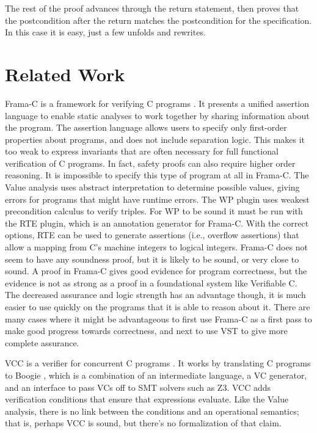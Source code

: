 \documentclass{puthesis}
\begin{document}
The rest of the proof advances through the return statement, then proves that
the postcondition after the return matches the postcondition for the 
specification. In this case it is easy, just a few unfolds and rewrites.


\section{Related Work}
Frama-C is a framework for verifying C programs
\cite{cuoq2012frama}. It presents a unified assertion language to
enable static analyses to work together by sharing information about
the program. The assertion language allows
users to specify only first-order properties about programs, and does
not include separation logic. This makes it too weak to express
invariants that are often necessary for full functional verification
of C programs. In fact, safety proofs can also require higher order
reasoning. It is impossible to specify this type of program at all in Frama-C.
The Value analysis \cite{canet2009value}
uses abstract interpretation to determine possible values, giving
errors for programs that might have runtime errors. The WP plugin uses
weakest precondition \cite{mull} calculus to verify triples.  For WP to be sound
it must be run with the RTE plugin\cite{RTEpluginmanual}, which is an annotation generator
for Frama-C. With the correct options, RTE can be used to generate
assertions (i.e., overflow assertions) that allow a mapping from C's
machine integers to logical integers. 
Frama-C does not seem to have any soundness proof, but it is likely to
be sound, or very close to sound. A proof in Frama-C gives good
evidence for program correctness, but the evidence is not as strong as
a proof in a foundational system like Verifiable C. The decreased
assurance and logic strength has an advantage though, it is much
easier to use quickly on the programs that it is able to reason about
it. There are many cases where it might be advantageous to first use
Frama-C as a first pass to make good progress towards correctness, and
next to use VST to give more complete assurance. 

VCC is a verifier for concurrent C programs \cite{VCCtphol}. It works
by translating C programs to Boogie \cite{Boogie}, which is a
combination of an intermediate language, a VC generator, and an
interface to pass VCs off to SMT solvers such as Z3\cite{z3:tacas}.
VCC adds verification conditions that ensure that expressions
evaluate. Like the Value analysis, there is no link between the
conditions and an operational semantics; that is, perhaps VCC is
sound, but there's no formalization of that claim. 
\end{document}
